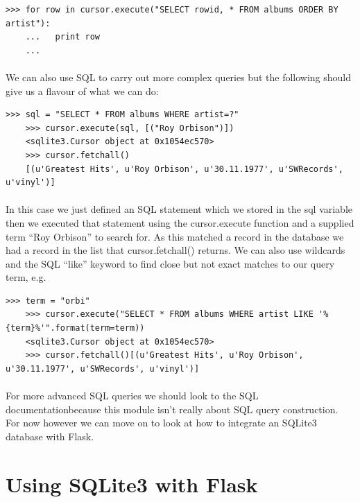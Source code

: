 \documentclass[12pt, a4paper, oneside]{book}
\begin{document}
{\begin{lstlisting}[style=DOS]
    >>> for row in cursor.execute("SELECT rowid, * FROM albums ORDER BY artist"):
    ...   print row
    ...
\end{lstlisting}

\paragraph{} We can also use SQL to carry out more complex queries but the following should give us a flavour of what we can do:

\begin{lstlisting}[style=DOS]
    >>> sql = "SELECT * FROM albums WHERE artist=?"
    >>> cursor.execute(sql, [("Roy Orbison")])
    <sqlite3.Cursor object at 0x1054ec570>
    >>> cursor.fetchall()
    [(u'Greatest Hits', u'Roy Orbison', u'30.11.1977', u'SWRecords', u'vinyl')]
\end{lstlisting}

\paragraph{} In this case we just defined an SQL statement which we stored in the sql variable then we executed that statement using the cursor.execute function and a supplied term ``Roy Orbison'' to search for. As this matched a record in the database we had a record in the list that cursor.fetchall() returns. We can also use wildcards and the SQL ``like'' keyword to find close but not exact matches to our query term, e.g.

\begin{lstlisting}[style=DOS]
    >>> term = "orbi"
    >>> cursor.execute("SELECT * FROM albums WHERE artist LIKE '%{term}%'".format(term=term))
    <sqlite3.Cursor object at 0x1054ec570>
    >>> cursor.fetchall()[(u'Greatest Hits', u'Roy Orbison', u'30.11.1977', u'SWRecords', u'vinyl')]
\end{lstlisting}

\paragraph{} For more advanced SQL queries we should look to the SQL documentationbecause this module isn't really about SQL query construction. For now however we can move on to look at how to integrate an SQLite3 database with Flask.

\section{Using SQLite3 with Flask}
\label{sqlite3-flask}
}
\end{document}
